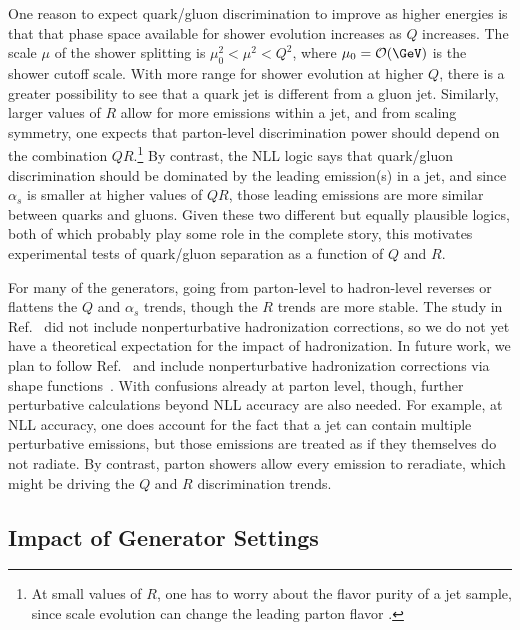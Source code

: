 \documentclass[11pt]{cernrep}
\begin{document}
One reason to expect quark/gluon discrimination to improve as higher energies is that that phase space available for shower evolution increases as $Q$ increases.  The scale $\mu$ of the shower splitting is $\mu_0^2 < \mu^2 < Q^2$, where $\mu_0 = \mathcal{O}(\GeV)$ is the shower cutoff scale.  With more range for shower evolution at higher $Q$, there is a greater possibility to see that a quark jet is different from a gluon jet.  Similarly, larger values of $R$ allow for more emissions within a jet, and from scaling symmetry, one expects that parton-level discrimination power should depend on the combination $Q R$.\footnote{At small values of $R$, one has to worry about the flavor purity of a jet sample, since scale evolution can change the leading parton flavor \cite{Dasgupta:2014yra,Dasgupta:2016bnd}.}  By contrast, the NLL logic says that quark/gluon discrimination should be dominated by the leading emission(s) in a jet, and since $\alpha_s$ is smaller at higher values of $Q R$, those leading emissions are more similar between quarks and gluons.  Given these two different but equally plausible logics, both of which probably play some role in the complete story, this motivates experimental tests of quark/gluon separation as a function of $Q$ and $R$.

For many of the generators, going from parton-level to hadron-level reverses or flattens the $Q$ and $\alpha_s$ trends, though the $R$ trends are more stable.  The study in Ref.~\cite{Larkoski:2013eya} did not include nonperturbative hadronization corrections, so we do not yet have a theoretical expectation for the impact of hadronization.  In future work, we plan to follow Ref.~\cite{Larkoski:2013paa} and include nonperturbative hadronization corrections via shape functions~\cite{Manohar:1994kq, Dokshitzer:1995zt, Korchemsky:1999kt, Korchemsky:2000kp, Salam:2001bd, Lee:2006nr, Mateu:2012nk}.  With confusions already at parton level, though, further perturbative calculations beyond NLL accuracy are also needed.  For example, at NLL accuracy, one does account for the fact that a jet can contain multiple perturbative emissions, but those emissions are treated as if they themselves do not radiate.  By contrast, parton showers allow every emission to reradiate, which might be driving the $Q$ and $R$ discrimination trends.

\subsection{Impact of Generator Settings}
\label{quarkgluon_sec:ee_settings}
\end{document}

